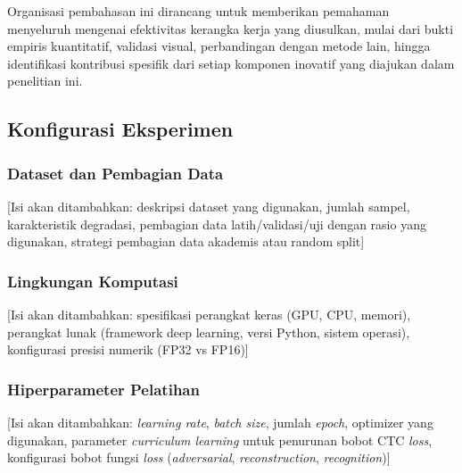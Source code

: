 \documentclass[12pt,a4paper]{article}
\begin{document}
\vspace{0.8em}

Organisasi pembahasan ini dirancang untuk memberikan pemahaman menyeluruh mengenai efektivitas kerangka kerja yang diusulkan, mulai dari bukti empiris kuantitatif, validasi visual, perbandingan dengan metode lain, hingga identifikasi kontribusi spesifik dari setiap komponen inovatif yang diajukan dalam penelitian ini.

\vspace{0.8em}

\subsection{Konfigurasi Eksperimen}
\label{subsec:konfigurasi-eksperimen}
\vspace{0.8em}

\subsubsection{Dataset dan Pembagian Data}
\label{subsubsec:dataset}

[Isi akan ditambahkan: deskripsi dataset yang digunakan, jumlah sampel, karakteristik degradasi, pembagian data latih/validasi/uji dengan rasio yang digunakan, strategi pembagian data akademis atau random split]

\vspace{0.8em}

\subsubsection{Lingkungan Komputasi}
\label{subsubsec:lingkungan-komputasi}

[Isi akan ditambahkan: spesifikasi perangkat keras (GPU, CPU, memori), perangkat lunak (framework deep learning, versi Python, sistem operasi), konfigurasi presisi numerik (FP32 vs FP16)]

\vspace{0.8em}

\subsubsection{Hiperparameter Pelatihan}
\label{subsubsec:hiperparameter}

[Isi akan ditambahkan: \textit{learning rate}, \textit{batch size}, jumlah \textit{epoch}, optimizer yang digunakan, parameter \textit{curriculum learning} untuk penurunan bobot CTC \textit{loss}, konfigurasi bobot fungsi \textit{loss} (\textit{adversarial}, \textit{reconstruction}, \textit{recognition})]
\end{document}
